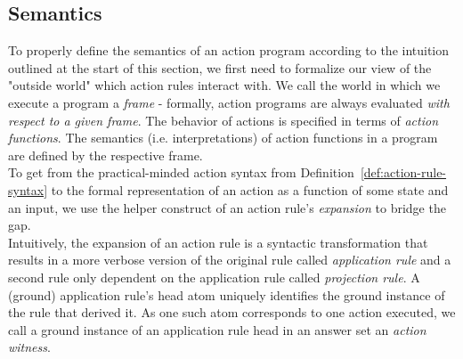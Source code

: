 \subsection{Semantics}
\label{subsec:evolog-actions-semantics}

To properly define the semantics of an action program according to the intuition outlined at the start of this section, we first need to formalize our view of the "outside world" which action rules interact with. We call the world in which we execute a program a \emph{frame} - formally, action programs are always evaluated \emph{with respect to a given frame}. The behavior of actions is specified in terms of \emph{action functions}. The semantics (i.e. interpretations) of action functions in a program are defined by the respective frame. \\

To get from the practical-minded action syntax from Definition~\ref{def:action-rule-syntax} to the formal representation of an action as a function of some state and an input, we use the helper construct of an action rule's \emph{expansion} to bridge the gap. \\

Intuitively, the expansion of an action rule is a syntactic transformation that results in a more verbose version of the original rule called \emph{application rule} and a second rule only dependent on the application rule called \emph{projection rule}. A (ground) application rule's head atom uniquely identifies the ground instance of the rule that derived it. As one such atom corresponds to one action executed, we call a ground instance of an application rule head in an answer set an \emph{action witness}. 


